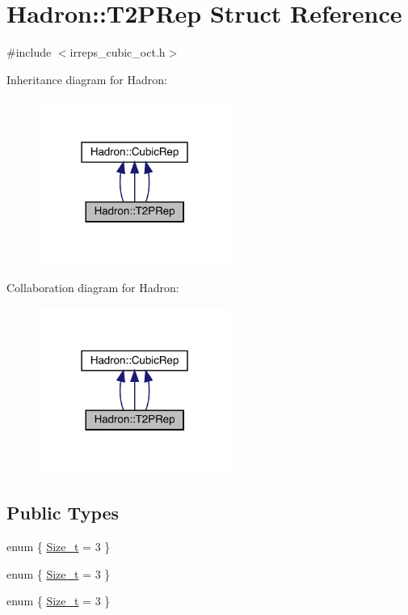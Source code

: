 \hypertarget{structHadron_1_1T2PRep}{}\section{Hadron\+:\+:T2\+P\+Rep Struct Reference}
\label{structHadron_1_1T2PRep}


{\ttfamily \#include $<$irreps\+\_\+cubic\+\_\+oct.\+h$>$}



Inheritance diagram for Hadron\+:
\nopagebreak
\begin{figure}[H]
\begin{center}
\leavevmode
\includegraphics[width=178pt]{dc/d95/structHadron_1_1T2PRep__inherit__graph}
\end{center}
\end{figure}


Collaboration diagram for Hadron\+:
\nopagebreak
\begin{figure}[H]
\begin{center}
\leavevmode
\includegraphics[width=178pt]{d9/da2/structHadron_1_1T2PRep__coll__graph}
\end{center}
\end{figure}
\subsection*{Public Types}
\begin{DoxyCompactItemize}
\item 
enum \{ \mbox{\hyperlink{structHadron_1_1T2PRep_a627b14942b70428473b45efaa58a74aead73baac7e5ae922d59fe2eab63d434e5}{Size\+\_\+t}} = 3
 \}
\item 
enum \{ \mbox{\hyperlink{structHadron_1_1T2PRep_a627b14942b70428473b45efaa58a74aead73baac7e5ae922d59fe2eab63d434e5}{Size\+\_\+t}} = 3
 \}
\item 
enum \{ \mbox{\hyperlink{structHadron_1_1T2PRep_a627b14942b70428473b45efaa58a74aead73baac7e5ae922d59fe2eab63d434e5}{Size\+\_\+t}} = 3
 \}
\end{DoxyCompactItemize}
